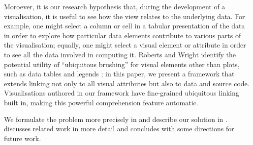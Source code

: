 Moroever, it is our research hypothesis that, during the development of a
visualisation, it is useful to see how the view relates to the underlying data.
For example, one might select a column or cell in a tabular presentation of the
data in order to explore how particular data elements contribute to various
parts of the visualisation; equally, one might select a visual element or
attribute in order to see all the data involved in computing it. Roberts and
Wright identify the potential utility of ``ubiquitous brushing'' for visual
elements other than plots, such as data tables and legends \cite{roberts06}; in
this paper, we present a framework that extends linking not only to all visual
attributes but also to data and source code. Visualisations authored in our
framework have fine-grained ubiquitous linking built in, making this powerful
comprehension feature automatic.

We formulate the problem more precisely in  and
describe our solution in .  discusses
related work in more detail and  concludes with some
directions for future work.
